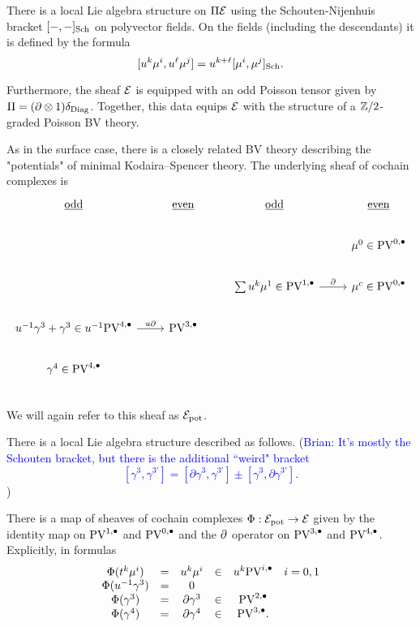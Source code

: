 \documentclass[11pt]{article}
\newcommand{\surya}[1]{(\textcolor{red}{Surya: #1})}
\newcommand{\brian}[1]{(\textcolor{blue}{Brian: #1})}
\newcommand\bu{\bullet}
\begin{document}
There is a local Lie algebra structure on $\Pi\mathcal{E}$ using the Schouten-Nijenhuis bracket $[-,-]_{\rm Sch}$ on polyvector fields.
On the fields (including the descendants) it is defined by the formula
\[
[u^k \mu^i , u^\ell \mu^j] = u^{k+\ell} [\mu^i, \mu^j]_{\rm Sch} .
\]

Furthermore, the sheaf $\mathcal{E}$ is equipped with an odd Poisson tensor given by $\Pi = (\partial\otimes 1)\delta_{\rm Diag}$. Together, this data equips $\mathcal{E}$ with the structure of a $\mathbb{Z}/2$-graded Poisson BV theory.

As in the surface case, there is a closely related BV theory describing the "potentials" of minimal Kodaira--Spencer theory.
The underlying sheaf of cochain complexes is 
\[
\begin{tikzcd}
\ul{\rm odd} & \ul{\rm even} & \ul{\rm odd} & \ul{\rm even} \\
& & & \mu^{0}\in\PV^{0,\bu} \\
& & \sum u^k \mu^{1}\in\PV^{1,\bu} \ar[r, "\partial"] & \mu^{c}\in\PV^{0,\bu} \\
u^{-1} \gamma^3 + \gamma^3  \in u^{-1} \PV^{4,\bu} \ar[r, "u \partial"] & \PV^{3,\bu} & &  \\
\gamma^{4} \in\PV^{4,\bu} &  &  & \\
\end{tikzcd}
\]
We will again refer to this sheaf as $\mathcal{E}_{\rm pot}$.

There is a local Lie algebra structure described as follows.
\brian{It's mostly the Schouten bracket, but there is the additional ``weird" bracket
\[
[\gamma^3, \gamma^{3'}] = [\partial \gamma^3 , \gamma^{3'}] \pm [\gamma^3, \partial \gamma^{3'}] .
\]
}

There is a map of sheaves of cochain complexes $\Phi: \mathcal{E}_{\rm pot}\to \mathcal{E}$ given by the identity map on $\PV^{1,\bu}$ and $\PV^{0,\bu}$ and the $\partial$ operator on $\PV^{3,\bu}$ and $\PV^{4,\bu}$. 
Explicitly, in formulas
\[
\begin{array}{ccccccccc}
\Phi(t^k \mu^{i}) & = & u^k \mu^i & \in & u^k \PV^{i, \bu} & i = 0,1 \\
\Phi(u^{-1} \gamma^3) & = & 0 \\
\Phi(\gamma^3) & = & \partial \gamma^3 & \in & \PV^{2,\bu} \\
\Phi(\gamma^4) & = & \partial \gamma^4 & \in & \PV^{3,\bu} .
\end{array} 
\]

\end{document}
